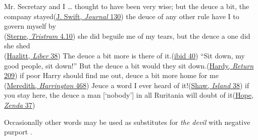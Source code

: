 \ea \label{ex:04-192}
\ea
Mr. Secretary and I {\dots} thought to have been very wise; but the deuce a bit, the company stayed\hfill(\href{https://archive.org/details/journaltostellae00swifuoft/page/130/mode/2up?q=\%22deuce+a+bit\%22&view=theater}{J. Swift, \textit{Journal} 130}) %
\ex
the deuce of any other rule have I to govern myself by\\\hfill(\href{https://www.gutenberg.org/files/39270/39270-h/39270-h.htm#bookIV_chapX}{Sterne, \textit{Tristram} 4.10}) %
\ex
she did beguile me of my tears, but the deuce a one did she shed\\\hfill(\href{https://archive.org/details/liberamoris00hazlgoog/page/n114/mode/2up?q=beguile&view=theater}{Hazlitt, \textit{Liber} 38})
\ex
The deuce a bit more is there of it.\hfill(\href{https://archive.org/details/liberamoris00hazlgoog/page/n118/mode/2up?q=\%22deuce+a+bit+more\%22&view=theater}{ibid 40})
\ex
``Sit down, my good people, sit down!'' But the deuce a bit would they sit down.\hfill(\href{https://archive.org/details/returnofthenativ00harduoft/page/160/mode/2up?q=\%22my+good+people\%22&view=theater}{Hardy, \textit{Return} 209}) %
\ex
if poor Harry should find me out, deuce a bit more home for me\\\hfill(\href{https://archive.org/details/evanharringtonno00mererich/page/424/mode/2up?q=\%22poor+Harry+should\%22&view=theater}{Meredith, \textit{Harrington} 468}) %
\ex
Jeuce a word I ever heard of it!\hfill(\href{https://archive.org/details/johnbullsotheris0000shaw_o3k8/page/52/mode/2up?q=jeuce}{Shaw, \textit{Island} 38}) %
\ex
if you stay here, the deuce a man [`nobody'] in all Ruritania will doubt of it\hfill(\href{https://archive.org/details/prisonerzendabe01hopegoog/page/n42/mode/2up?q=\%22deuce+a+man\%22&view=theater}{Hope, \textit{Zenda} 37}) %
\z
\z

Occasionally other words may be used as substitutes for \textit{the devil} with negative purport .

